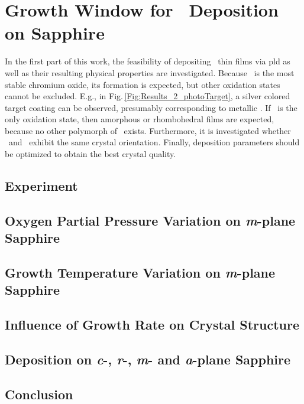 \section{Growth Window for \texorpdfstring{\cro}{Cr2O3}\ Deposition on Sapphire}
    \label{Sec:Results_Preliminary}
In the first part of this work, the feasibility of depositing \cro\ thin films via \gls{pld} as well as their resulting physical properties are investigated.
Because \cro\ is the most stable chromium oxide, its formation is expected, but other oxidation states cannot be excluded.
E.g., in Fig.\,\ref{Fig:Results_2_photoTarget}, a silver colored target coating can be observed, presumably corresponding to metallic .
If \cro\ is the only oxidation state, then amorphous or rhombohedral films are expected, because no other polymorph of \cro\ exists.
Furthermore, it is investigated whether \alo\ and \cro\ exhibit the same crystal orientation.
Finally, deposition parameters should be optimized to obtain the best crystal quality.

\subsection{Experiment}
    

    \subsection{Oxygen Partial Pressure Variation on \textit{m}-plane Sapphire}
        
    \subsection{Growth Temperature Variation on \textit{m}-plane Sapphire}
        
        \clearpage
    \subsection{Influence of Growth Rate on Crystal Structure}
        
    \subsection{Deposition on \textit{c}-, \textit{r}-, \textit{m}- and \textit{a}-plane Sapphire}
        

\subsection{Conclusion}
    